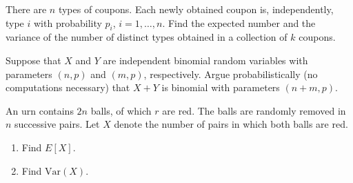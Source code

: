 \begin{exercise}
\label{ex:random-variables-56}
There are $n$ types of coupons. Each newly obtained coupon is, independently, type $i$ with probability $p_i$, $i=1,\ldots,n$. Find the expected number and the variance of the number of distinct types obtained in a collection of $k$ coupons.
\end{exercise}


\begin{exercise}
\label{ex:random-variables-57}
Suppose that $X$ and $Y$ are independent binomial random variables with parameters $(n,p)$ and $(m,p)$, respectively. Argue probabilistically (no computations necessary) that $X+Y$ is binomial with parameters $(n+m,p)$.
\end{exercise}


\begin{exercise}
\label{ex:random-variables-58}
An urn contains $2n$ balls, of which $r$ are red. The balls are randomly removed in $n$ successive pairs. Let $X$ denote the number of pairs in which both balls are red.
\begin{enumerate}
    \item[(a)] Find $E[X]$.
    \item[(b)] Find $\mathrm{Var}(X)$.
\end{enumerate}
\end{exercise}

